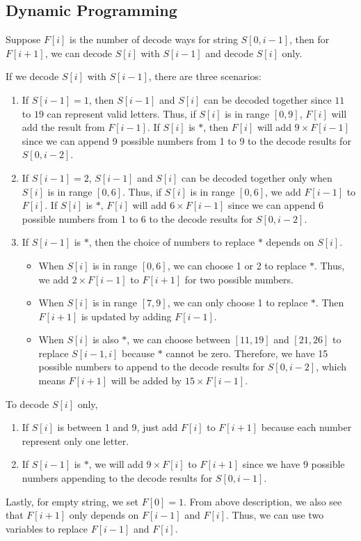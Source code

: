 \subsection{Dynamic Programming}
Suppose $F[i]$ is the number of decode ways for string $S[0, i-1]$, then for $F[i+1]$, we can decode $S[i]$ with $S[i-1]$ and decode $S[i]$ only.

If we decode $S[i]$ with $S[i-1]$, there are three scenarios: 
\begin{enumerate}
\item If $S[i-1] = 1$, then $S[i-1]$ and $S[i]$ can be decoded together since $11$ to $19$ can represent valid letters. Thus, if $S[i]$ is in range $[0,9]$, $F[i]$ will add the result from $F[i-1]$. If $S[i]$ is $\ast$, then $F[i]$ will add $9\times F[i-1]$ since we can append 9 possible numbers from 1 to 9 to the decode results for $S[0,i-2]$.
\item If $S[i-1] = 2$, $S[i-1]$ and $S[i]$ can be decoded together only when $S[i]$ is in range $[0,6]$. Thus, if $S[i]$ is in range $[0,6]$, we add $F[i-1]$ to $F[i]$. If $S[i]$ is $\ast$, $F[i]$ will add $6 \times F[i-1]$ since we can append 6 possible numbers from 1 to 6 to the decode results for $S[0, i-2]$.
\item If $S[i-1]$ is $\ast$, then the choice of numbers to replace $\ast$ depends on $S[i]$.
\begin{itemize}
\item When $S[i]$ is in range $[0,6]$, we can choose 1 or 2 to replace $\ast$. Thus, we add $2\times F[i-1]$ to $F[i+1]$ for two possible numbers.
\item When $S[i]$ is in range $[7,9]$, we can only choose 1 to replace $\ast$. Then $F[i+1]$ is updated by adding $F[i-1]$.
\item When $S[i]$ is also $\ast$, we can choose between $[11,19]$ and $[21,26]$ to replace $S[i-1, i]$ because $\ast$ cannot be zero. Therefore, we have 15 possible numbers to append to the decode results for $S[0, i-2]$, which means $F[i+1]$ will be added by $15\times F[i-1]$.
\end{itemize}
\end{enumerate}

To decode $S[i]$ only, 

\begin{enumerate}
\item If $S[i]$ is between 1 and 9, just add $F[i]$ to $F[i+1]$ because each number represent only one letter.
\item If $S[i-1]$ is $\ast$, we will add $9\times F[i]$ to $F[i+1]$ since we have 9 possible numbers appending to the decode results for $S[0, i-1]$. 
\end{enumerate}

Lastly, for empty string, we set $F[0]=1$. From above description, we also see that $F[i+1]$ only depends on $F[i-1]$ and $F[i]$. Thus, we can use two variables to replace $F[i-1]$ and $F[i]$. 